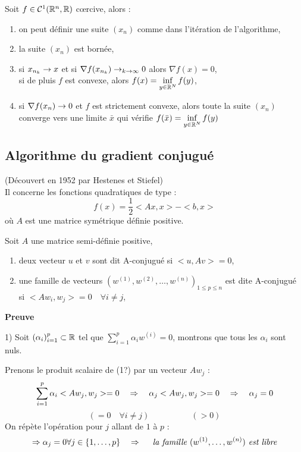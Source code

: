 \begin{theoreme}
Soit $f\in\mathcal{C}^1(\mathbb{R}^n,\mathbb{R})$ c\oe rcive, alors :
\begin{enumerate}
\item on peut définir une suite $(x_n)$ comme dans l'itération de l'algorithme,
\item la suite $(x_n)$ est bornée,
\item si $x_{n_k}\rightarrow x$ et si $\nabla f(x_{n_k})\rightarrow_{k\rightarrow \infty}0$ alors $\nabla f(x)=0$,\\
si de pluis $f$ est convexe, alors $\displaystyle f(x)=\inf_{y\in\mathbb{R}^N} f(y)$,
\item si $\nabla f(x_n)\rightarrow 0$ et $f$ est strictement convexe, alors toute la suite $(x_n)$ converge vers une limite $\bar{x}$ qui vérifie $\displaystyle f(\bar{x})=\inf_{y\in\mathbb{R}^N} f(y)$
\end{enumerate}
\end{theoreme}

\subsection{Algorithme du gradient conjugué}
(Découvert en 1952 par Hestenes et Stiefel)\\
Il concerne les fonctions quadratiques de type : \[ f(x)=\frac{1}{2}<Ax,x>-<b,x> \]
où $A$ est une matrice symétrique définie positive.

\begin{definition}
Soit $A$ une matrice semi-définie positive,
\begin{enumerate}
\item deux vecteur $u$ et $v$ sont dit A-conjugué si $<u,Av>=0$,
\item une famille de vecteurs $(w^{(1)},w^{(2)},\dots,w^{(n)})_{1\leq p \leq n}$ est dite A-conjugué \\ si $<Aw_i,w_j>=0 \quad \forall i\ne j$,
\end{enumerate}
\end{definition}

\textbf{Preuve}

1) Soit $\displaystyle (\alpha_i)_{i=1}^p \subset \mathbb{R}$ tel que $\displaystyle \sum_{i=1}^p \alpha_iw^{(i)}=0$, montrons que tous les $\alpha_i$ sont nuls.

Prenons le produit scalaire de (1?) par un vecteur $Aw_j$ : \[ \sum_{i=1}^p \alpha_i<Aw_j,w_j>=0 \quad \Rightarrow \quad \alpha_j<Aw_j,w_j>=0 \quad\Rightarrow\quad \alpha_j=0 \] 
\[ (=0 \quad\forall i\ne j) \quad\quad\quad\quad\quad (>0) \]
On répète l'opération pour $j$ allant de $1$ à $p$ :
\[ \Rightarrow \alpha_j=0 \forall j\in\{1,\dots,p\} \quad\Rightarrow\quad \textit{ la famille } (w^{(1)},\dots,w^{(n)})\textit{ est libre} \]

